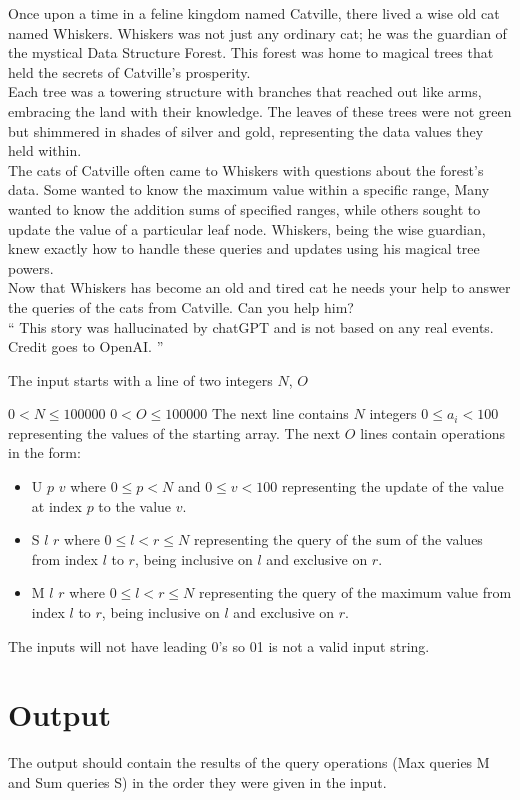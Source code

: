 

\noindent Once upon a time in a feline kingdom named Catville, there lived a wise old cat named Whiskers. Whiskers was not just any ordinary cat; he was the guardian of the mystical Data Structure Forest. This forest was home to magical trees that held the secrets of Catville's prosperity.
\\

\noindent Each tree was a towering structure with branches that reached out like arms, embracing the land with their knowledge. The leaves of these trees were not green but shimmered in shades of silver and gold, representing the data values they held within.
\\

\noindent The cats of Catville often came to Whiskers with questions about the forest's data. Some wanted to know the maximum value within a specific range, Many wanted to know the addition sums of specified ranges, while others sought to update the value of a particular leaf node. Whiskers, being the wise guardian, knew exactly how to handle these queries and updates using his magical tree powers.
\\

\noindent Now that Whiskers has become an old and tired cat he needs your help to answer the queries of the cats from Catville. Can you help him?
\\

\noindent `` This story was hallucinated by chatGPT and is not based on any real events. Credit goes to OpenAI. '' 

{\setlength{\parindent}{0cm}
}
\begin{Input}
The input starts with a line of two integers $N$, $O$
\newline
{\setlength{\parindent}{0cm}
$0 < N \leq 100 000$
\newline
$0 < O \leq 100 000$ 
\newline
The next line contains $N$ integers $0 \leq a_i < 100$ representing the values of the starting array.  
\newline
The next $O$ lines contain operations in the form:
\begin{itemize}
    \item U $p$ $v$ where $0 \leq p < N$ and $0 \leq v < 100$ representing the update of the value at index $p$ to the value $v$.
    \item S $l$ $r$ where $0 \leq l < r \leq N$ representing the query of the sum of the values from index $l$ to $r$, being inclusive on $l$ and exclusive on $r$.
    \item M $l$ $r$ where $0 \leq l < r \leq N$ representing the query of the maximum value from index $l$ to $r$, being inclusive on $l$ and exclusive on $r$.
\end{itemize}
}
{\setlength{\parindent}{0cm}
The inputs will not have leading 0's so 01 is not a valid input string.
}
\end{Input}

\section*{Output}
The output should contain the results of the query operations (Max queries M and Sum queries S) in the order they were given in the input. 
{\setlength{\parindent}{0cm}
}

